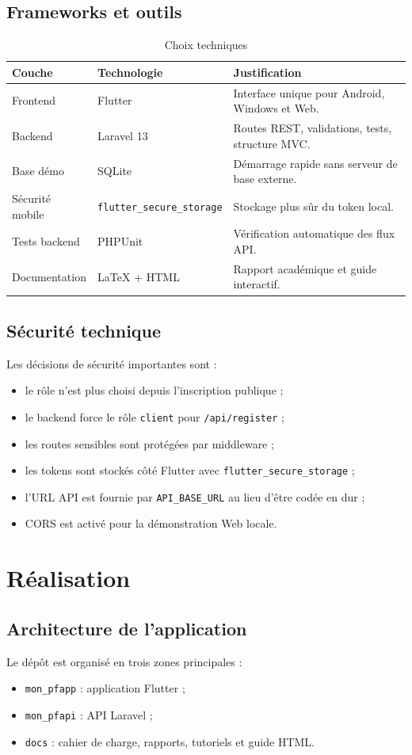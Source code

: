 \documentclass[12pt,a4paper]{report}
\begin{document}
\section{Frameworks et outils}
\begin{longtable}{p{4cm}p{4cm}p{6cm}}
\caption{Choix techniques}\\
\toprule
\textbf{Couche} & \textbf{Technologie} & \textbf{Justification}\\
\midrule
Frontend & Flutter & Interface unique pour Android, Windows et Web.\\
Backend & Laravel 13 & Routes REST, validations, tests, structure MVC.\\
Base démo & SQLite & Démarrage rapide sans serveur de base externe.\\
Sécurité mobile & \texttt{flutter\_secure\_storage} & Stockage plus sûr du token local.\\
Tests backend & PHPUnit & Vérification automatique des flux API.\\
Documentation & LaTeX + HTML & Rapport académique et guide interactif.\\
\bottomrule
\end{longtable}

\section{Sécurité technique}
Les décisions de sécurité importantes sont :
\begin{itemize}
  \item le rôle n'est plus choisi depuis l'inscription publique ;
  \item le backend force le rôle \texttt{client} pour \texttt{/api/register} ;
  \item les routes sensibles sont protégées par middleware ;
  \item les tokens sont stockés côté Flutter avec \texttt{flutter\_secure\_storage} ;
  \item l'URL API est fournie par \texttt{API\_BASE\_URL} au lieu d'être codée en dur ;
  \item CORS est activé pour la démonstration Web locale.
\end{itemize}

\chapter{Réalisation}
\section{Architecture de l'application}
Le dépôt est organisé en trois zones principales :
\begin{itemize}
  \item \texttt{mon\_pfapp} : application Flutter ;
  \item \texttt{mon\_pfapi} : API Laravel ;
  \item \texttt{docs} : cahier de charge, rapports, tutoriels et guide HTML.
\end{itemize}
\end{document}
